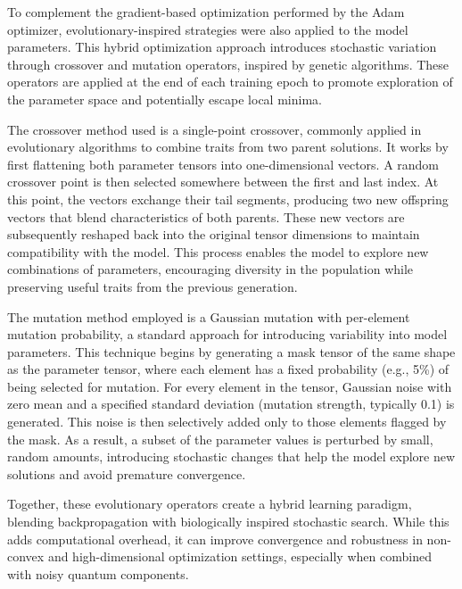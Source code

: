 \documentclass[conference]{IEEEtran}
\begin{document}
To complement the gradient-based optimization performed by the Adam optimizer, evolutionary-inspired strategies were also applied to the model parameters. This hybrid optimization approach introduces stochastic variation through crossover and mutation operators, inspired by genetic algorithms. These operators are applied at the end of each training epoch to promote exploration of the parameter space and potentially escape local minima.

The crossover method used is a single-point crossover, commonly applied in evolutionary algorithms to combine traits from two parent solutions. It works by first flattening both parameter tensors into one-dimensional vectors. A random crossover point is then selected somewhere between the first and last index. At this point, the vectors exchange their tail segments, producing two new offspring vectors that blend characteristics of both parents. These new vectors are subsequently reshaped back into the original tensor dimensions to maintain compatibility with the model. This process enables the model to explore new combinations of parameters, encouraging diversity in the population while preserving useful traits from the previous generation.

The mutation method employed is a Gaussian mutation with per-element mutation probability, a standard approach for introducing variability into model parameters. This technique begins by generating a mask tensor of the same shape as the parameter tensor, where each element has a fixed probability (e.g., 5\%) of being selected for mutation. For every element in the tensor, Gaussian noise with zero mean and a specified standard deviation (mutation strength, typically 0.1) is generated. This noise is then selectively added only to those elements flagged by the mask. As a result, a subset of the parameter values is perturbed by small, random amounts, introducing stochastic changes that help the model explore new solutions and avoid premature convergence.

Together, these evolutionary operators create a hybrid learning paradigm, blending backpropagation with biologically inspired stochastic search. While this adds computational overhead, it can improve convergence and robustness in non-convex and high-dimensional optimization settings, especially when combined with noisy quantum components.
\end{document}
